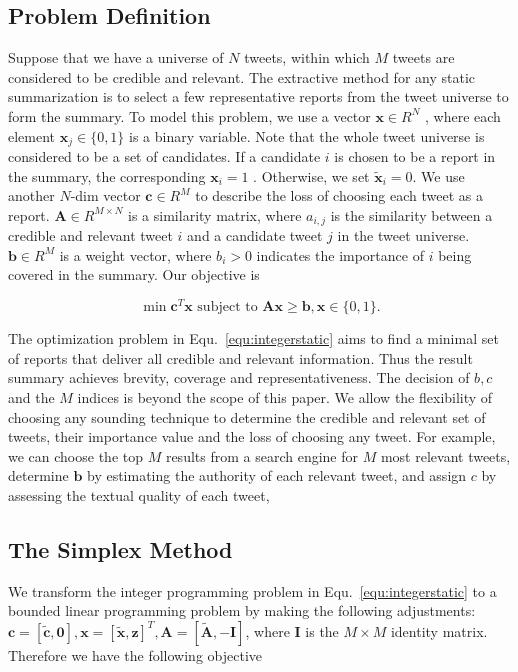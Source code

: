 \documentclass{llncs}
\begin{document}
\subsection{Problem Definition}
Suppose that we have a universe of $N$ tweets, within which $M$ tweets are considered to be credible and relevant. The extractive method for any static summarization is to select a few representative reports from the tweet universe to form the summary. To model this problem, we use a vector $\mathbf{x}\in R^N$ , where each element $\mathbf{x}_j\in \{0,1\}$ is a binary variable. Note that the whole tweet universe is considered to be a set of candidates. If a candidate  $i$ is chosen to be a report in the summary, the corresponding $\mathbf{x}_i=1$ . Otherwise, we set  $\tilde{\mathbf{x}}_i=0$. We use another $N$-dim vector $\mathbf{c}\in R^M$ to describe the loss of choosing each tweet as a report. $\mathbf{A}\in R^{M\times N}$  is a similarity matrix, where $a_{i,j}$  is the similarity between a credible and relevant tweet $i$ and a candidate tweet $j$ in the tweet universe. $\mathbf{b}\in R^{M}$ is a weight vector, where $b_{i}>0$ indicates the importance of $i$ being covered in the summary. Our objective is

\begin{equation}\label{equ:integerstatic}
\min \mathbf{c}^T \mathbf{x} \textrm{ subject to } \mathbf{A} \mathbf{x} \geq \mathbf{b}, \mathbf{x}\in \{0,1\}.
\end{equation}

The optimization problem in Equ.~\ref{equ:integerstatic} aims to find a minimal set of reports that deliver all credible and relevant information. Thus the result summary achieves brevity, coverage and representativeness. The decision of $b,c$ and the $M$ indices is beyond the scope of this paper. We allow the flexibility of choosing any sounding technique to determine the credible and relevant set of tweets, their importance value and the loss of choosing any tweet. For example,  we can choose the top $M$ results from a search engine for $M$ most relevant tweets, determine $\mathbf{b}$  by estimating  the authority of each relevant tweet, and assign $c$ by assessing the textual quality of each tweet,  

\subsection{The Simplex Method}
We transform the integer programming problem in Equ.~\ref{equ:integerstatic} to a bounded linear programming problem by making the following adjustments: $\mathbf{c}=[\tilde{\mathbf{c}},\mathbf{0}],\mathbf{x}=[\tilde{\mathbf{x}},\mathbf{z}]^T,\mathbf{A}=[\tilde{\mathbf{A}},-\mathbf{I}]$, where $\mathbf{I}$ is the $M\times M$ identity matrix. Therefore we have the following objective
\end{document}
